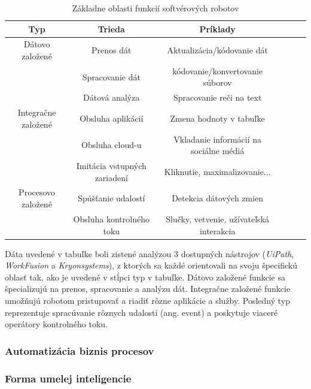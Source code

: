 \documentclass[twoside,slovak, a4paper]{article}
\begin{document}
\begin{table}[h]
    \centering
    \caption{Základne oblasti funkcií softvérových robotov\cite{Hofmann2020}}
    \begin{tabular}{|c|c|c|c|c|c|} %
        \hline
        \textbf{Typ} & \textbf{Trieda} & \textbf{Príklady} \\
        \hline\hline
        Dátovo založené & Prenos dát & Aktualizácia/kódovanie dát \\
        & Spracovanie dát & kódovanie/konvertovanie súborov \\
        
        & Dátová analýza & Spracovanie reči na text \\
        Integračne založené & Obsluha aplikácií & Zmena hodnoty v tabuľke \\
        & Obsluha cloud-u & Vkladanie informácií na sociálne médiá\\
        & Imitácia vstupných zariadení & Kliknutie, maximalizovanie...\\
        Procesovo založené & Spúšťanie udalostí & Detekcia dátových zmien \\ 
        & Obsluha kontrolného toku& Slučky, vetvenie, užívateľská interakcia\\
        
        \hline
    \end{tabular}
\end{table}

Dáta uvedené v tabuľke boli zistené analýzou 3 dostupných nástrojov (\textit{UiPath}, \textit{WorkFusion} a \textit{Kryonsystems}), z ktorých sa každé orientovali na svoju špecifickú oblasť tak, ako je uvedené v stĺpci typ v tabuľke. Dátovo založené funkcie sa špecializujú na prenos, spracovanie a analýzu dát. Integračne založené funkcie umožňujú robotom pristupovať a riadiť rôzne aplikácie a služby. Posledný typ reprezentuje spracúvanie rôznych udalostí (ang. event) a poskytuje viaceré operátory kontrolného toku\cite{Hofmann2020}.


\subsubsection{Automatizácia biznis procesov}

\subsubsection{Forma umelej inteligencie}
\end{document}
